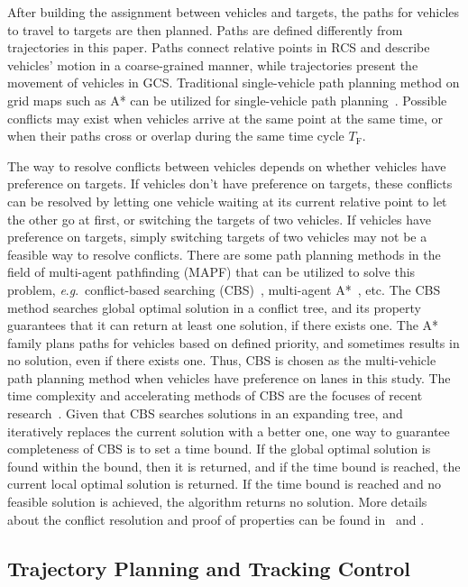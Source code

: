 \documentclass[journal]{IEEEtranTIE}
\newcommand{\eg}{\textit{e}.\textit{g}.}
\begin{document}
After building the assignment between vehicles and targets, the paths for vehicles to travel to targets are then planned. Paths are defined differently from trajectories in this paper. Paths connect relative points in RCS and describe vehicles' motion in a coarse-grained manner, while trajectories present the movement of vehicles in GCS. Traditional single-vehicle path planning method on grid maps such as A* can be utilized for single-vehicle path planning~\cite{hart1968formal}. Possible conflicts may exist when vehicles arrive at the same point at the same time, or when their paths cross or overlap during the same time cycle $T_\text{F}$. 


The way to resolve conflicts between vehicles depends on whether vehicles have preference on targets. If vehicles don't have preference on targets, these conflicts can be resolved by letting one vehicle waiting at its current relative point to let the other go at first, or switching the targets of two vehicles. If vehicles have preference on targets, simply switching targets of two vehicles may not be a feasible way to resolve conflicts. There are some path planning methods in the field of multi-agent pathfinding (MAPF) that can be utilized to solve this problem, \eg\, conflict-based searching (CBS)~\cite{sharon2015conflict}, multi-agent A*~\cite{wagner2011m}, etc. The CBS method searches global optimal solution in a conflict tree, and its property guarantees that it can return at least one solution, if there exists one. The A* family plans paths for vehicles based on defined priority, and sometimes results in no solution, even if there exists one. Thus, CBS is chosen as the multi-vehicle path planning method when vehicles have preference on lanes in this study. The time complexity and accelerating methods of CBS are the focuses of recent research~\cite{felner2018adding, li2019improved}. Given that CBS searches solutions in an expanding tree, and iteratively replaces the current solution with a better one, one way to guarantee completeness of CBS is to set a time bound. If the global optimal solution is found within the bound, then it is returned, and if the time bound is reached, the current local optimal solution is returned. If the time bound is reached and no feasible solution is achieved, the algorithm returns no solution. More details about the conflict resolution and proof of properties can be found in~\cite{cai2021formationb} and \cite{cai2021formationc}.


%
\subsection{Trajectory Planning and Tracking Control}
\label{trajectoryplanning}
%
\end{document}
